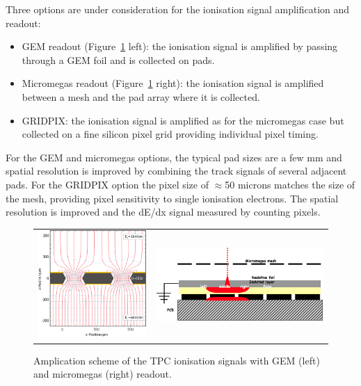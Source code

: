 Three options are under consideration for the ionisation signal amplification and readout:
\begin{itemize}
    \item GEM readout (Figure~\ref{fig:det:TPC_readout} left): the ionisation signal is amplified by passing through a GEM foil and is collected on pads.
    \item Micromegas readout (Figure~\ref{fig:det:TPC_readout} right): the ionisation signal is amplified between a mesh and the pad array where it is collected.
    \item GRIDPIX: the ionisation signal is amplified as for the micromegas case but collected on a fine silicon pixel grid providing individual pixel timing.
\end{itemize}
\vspace{0.5cm}
For the GEM and micromegas options, the typical pad sizes are a few mm and spatial resolution is improved by combining the track signals of several adjacent pads. For the GRIDPIX option the pixel size of $\approx$50 microns matches the size of the mesh, providing pixel sensitivity to single ionisation electrons. The spatial resolution is improved and the dE/dx signal measured by counting pixels. 

\begin{figure}[t!]
\begin{tabular}{cc}
\includegraphics[width=0.5\hsize,viewport={0 -10 600 500},clip]{Detector/fig/GEM.png} &
\includegraphics[width=0.4\hsize]{Detector/fig/micromegas.png}
\end{tabular}
\caption[TPC readout]{Amplication scheme of the TPC ionisation signals with GEM (left) and micromegas (right) readout.}
\label{fig:det:TPC_readout}
\end{figure}

